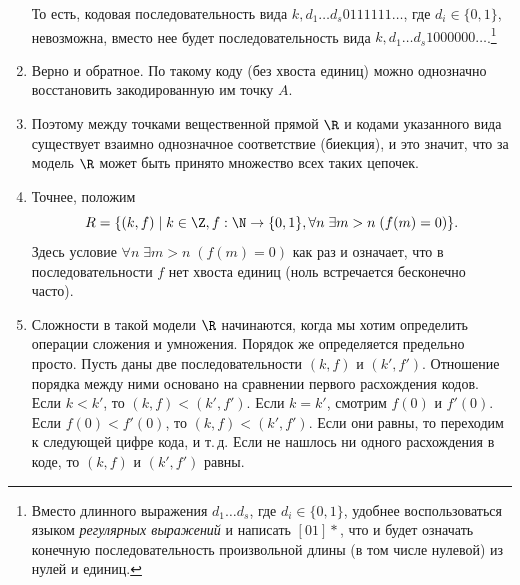 \begin{enumerate}
То есть, кодовая последовательность вида $k,d_1\dots d_s0111111\dots$, где $d_i\in\{0,1\}$, невозможна, вместо нее будет последовательность вида $k,d_1\dots d_s1000000\dots$.\footnote{Вместо длинного выражения $d_1\dots d_s$, где $d_i\in\{0,1\}$, удобнее воспользоваться языком \textit{регулярных выражений} и написать $[01]*$, что и будет означать конечную последовательность произвольной длины (в том числе нулевой) из нулей и единиц.}

\item Верно и обратное. По такому коду (без хвоста единиц) можно однозначно восстановить закодированную им точку $A$.
\item Поэтому между точками вещественной прямой $\R$ и кодами указанного вида существует взаимно однозначное соответствие (биекция), и это значит, что за модель $\R$ может быть принято множество всех таких цепочек.
\item Точнее, положим
$$
R=\{(k,f)\mid k\in\Z, f:\N\to\{0,1\}, \forall n\; \exists m>n\;(f(m)=0)\}.
$$
Здесь условие $\forall n\;\exists m>n\;(f(m)=0)$ как раз и означает, что в последовательности $f$ нет хвоста единиц (ноль встречается бесконечно часто).

\item Сложности в такой модели $\R$ начинаются, когда мы хотим определить операции сложения и умножения. Порядок же определяется предельно просто. Пусть даны две последовательности $(k,f)$ и $(k',f')$. Отношение порядка между ними основано на сравнении первого расхождения кодов. Если $k<k'$, то $(k,f)<(k',f')$. Если $k=k'$, смотрим $f(0)$ и $f'(0)$. Если $f(0)<f'(0)$, то $(k,f)<(k',f')$. Если они равны, то переходим к следующей цифре кода, и т.\,д. Если не нашлось ни одного расхождения в коде, то $(k,f)$ и $(k',f')$ равны.


\end{enumerate}
